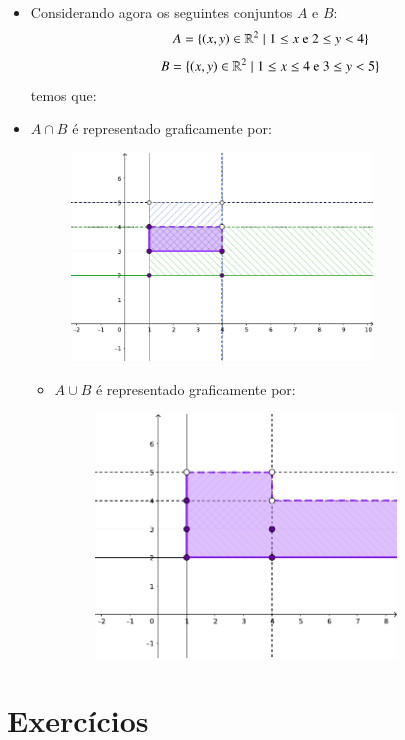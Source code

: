 \begin{itemize}
 \item Considerando agora os seguintes conjuntos $A$ e $B$:
 \[A= \{(x, y) \in \mathbb{R}^2 \mid 1 \leq x \text{ e } 2 \leq y < 4 \}\]
 \[B= \{(x, y) \in \mathbb{R}^2 \mid 1 \leq x \leq 4 \text{ e } 3 \leq y < 5 \}\]
 temos que:

 \item $A \cap B$ é representado graficamente por:
    \begin{figure}[H]
 \centering
 \includegraphics[width=8cm]{Capitulos/Figuras/cartesianointersecao.pdf}
 \end{figure}

 \begin{itemize}
 \item $A \cup B$ é representado graficamente por:
    \begin{figure}[H]
 \centering
 \includegraphics[width=8cm]{Capitulos/Figuras/cartesianouniao.pdf}
 \end{figure}

 \end{itemize}

\end{itemize}

\section{Exercícios}


